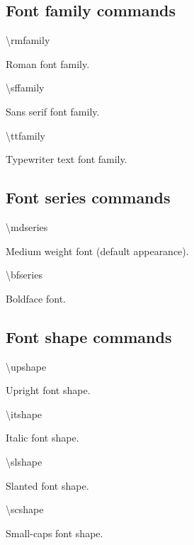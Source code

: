 \documentclass[twoside,openany]{thesis}
\begin{document}
\clearpage

\subsection{Font family commands}\label{subsec:Font family commands}

\begin{listing}

\item   {\ttfamily\textbackslash rmfamily}

        Roman font family.

\item   {\ttfamily\textbackslash sffamily}

        Sans serif font family.

\item   {\ttfamily\textbackslash ttfamily}

        Typewriter text font family.

\end{listing}

\subsection{Font series commands}\label{subsec:Font series commands}

\begin{listing}

\item   {\ttfamily\textbackslash mdseries}

        Medium weight font (default appearance).

\item   {\ttfamily\textbackslash bfseries}

        Boldface font.

\end{listing}

\subsection{Font shape commands}\label{subsec:Font shape commands}

\begin{listing}

\item   {\ttfamily\textbackslash upshape}

        Upright font shape.

\item   {\ttfamily\textbackslash itshape}

        Italic font shape.

\item   {\ttfamily\textbackslash slshape}

        Slanted font shape.

\item   {\ttfamily\textbackslash scshape}

        Small-caps font shape.

\end{listing}
\end{document}
